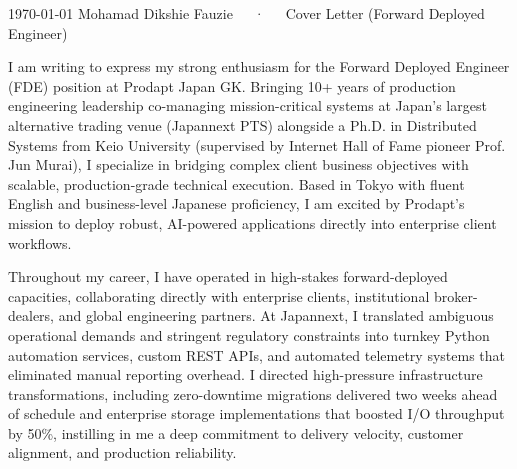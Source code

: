 \documentclass[11pt, a4paper]{awesome-cv}
\begin{document}
\makecvheader[R]

\makecvfooter
  {\today}
  {Mohamad Dikshie Fauzie~~~·~~~Cover Letter (Forward Deployed Engineer)}
  {}

\makelettertitle

\begin{cvletter}

I am writing to express my strong enthusiasm for the Forward Deployed Engineer (FDE) position at Prodapt Japan GK. Bringing 10+ years of production engineering leadership co-managing mission-critical systems at Japan's largest alternative trading venue (Japannext PTS) alongside a Ph.D. in Distributed Systems from Keio University (supervised by Internet Hall of Fame pioneer Prof. Jun Murai), I specialize in bridging complex client business objectives with scalable, production-grade technical execution. Based in Tokyo with fluent English and business-level Japanese proficiency, I am excited by Prodapt's mission to deploy robust, AI-powered applications directly into enterprise client workflows.

Throughout my career, I have operated in high-stakes forward-deployed capacities, collaborating directly with enterprise clients, institutional broker-dealers, and global engineering partners. At Japannext, I translated ambiguous operational demands and stringent regulatory constraints into turnkey Python automation services, custom REST APIs, and automated telemetry systems that eliminated manual reporting overhead. I directed high-pressure infrastructure transformations, including zero-downtime migrations delivered two weeks ahead of schedule and enterprise storage implementations that boosted I/O throughput by 50\%, instilling in me a deep commitment to delivery velocity, customer alignment, and production reliability.


\end{cvletter}
\end{document}
